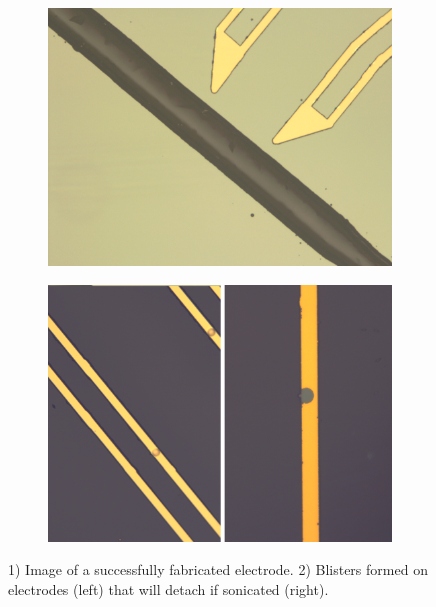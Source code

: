 \documentclass[final]{jyflluk}
\begin{document}
\begin{figure}[!h]
    \centering
    \begin{subfigure}{0.48\textwidth}
        \centering
        \includegraphics[width=\linewidth]{optical/good5.png} 
        \caption{} \label{fig:lileee}
    \end{subfigure}
    \hfill
    \begin{subfigure}{0.48\textwidth}
        \centering
        \includegraphics[width=\linewidth]{optical/blisters.png} 
        \caption{} \label{fig:lellqqq}
    \end{subfigure}
    \caption{1) Image of a successfully fabricated electrode. 2) Blisters formed on electrodes (left) that will detach if sonicated (right).} \label{fig:ghj}
\end{figure}  
\end{document}
